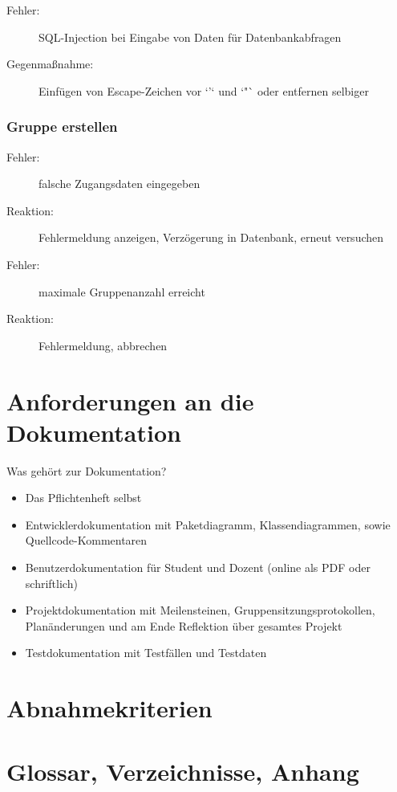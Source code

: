 \documentclass{article}
\begin{document}
\begin{description}
\item[Fehler:] SQL-Injection bei Eingabe von Daten für Datenbankabfragen
\item[Gegenmaßnahme:] Einfügen von Escape-Zeichen vor `'` und `"` oder entfernen selbiger
\end{description}

\section{Gruppe erstellen}
\begin{description}
\item[Fehler:] falsche Zugangsdaten eingegeben
\item[Reaktion:] Fehlermeldung anzeigen, Verzögerung in Datenbank, erneut versuchen
\end{description}
\begin{description}
\item[Fehler:] maximale Gruppenanzahl erreicht
\item[Reaktion:] Fehlermeldung, abbrechen
\end{description}


\newpage
\part{Anforderungen an die Dokumentation}
Was gehört zur Dokumentation?
\begin{itemize}
\item Das Pflichtenheft selbst
\item Entwicklerdokumentation mit Paketdiagramm, Klassendiagrammen, sowie Quellcode-Kommentaren
\item Benutzerdokumentation für Student und Dozent (online als PDF oder schriftlich)
\item Projektdokumentation mit Meilensteinen, Gruppensitzungsprotokollen, Planänderungen und am Ende Reflektion über gesamtes Projekt
\item Testdokumentation mit Testfällen und Testdaten
\end{itemize}

\newpage
\part{Abnahmekriterien}


\newpage
\part{Glossar, Verzeichnisse, Anhang}
\end{document}

